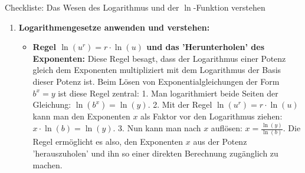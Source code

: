 \begin{loesungsumgebung}{Checkliste: Das Wesen des Logarithmus und der $\ln$-Funktion verstehen}
\begin{enumerate}[label=(\alph*)]
\begin{itemize}
        \item \textbf{Unterschiede im Graphenverlauf zwischen $g(x)=e^x$ und $f(x)=\ln(x)$:}
        \begin{itemize}
            \item \textbf{Monotonie:} Beide Funktionen sind streng monoton steigend in ihrem gesamten Definitionsbereich.
            \item \textbf{Krümmung:}
            $g(x)=e^x$: $g''(x)=e^x > 0$ für alle $x$. Der Graph ist immer linksgekrümmt (konvex).
            $f(x)=\ln(x)$: $f''(x)=-1/x^2 < 0$ für $x>0$. Der Graph ist immer rechtsgekrümmt (konkav).
            \item \textbf{Asymptoten:}
            $g(x)=e^x$: Hat eine horizontale Asymptote $y=0$ für $x \to -\infty$. Keine senkrechten Asymptoten.
            $f(x)=\ln(x)$: Hat eine senkrechte Asymptote $x=0$ (die y-Achse) für $x \to 0^+$, wobei $f(x) \to -\infty$. Keine horizontalen Asymptoten ($f(x) \to \infty$ für $x \to \infty$).
            \item \textbf{Achsenschnittpunkte:}
            $g(x)=e^x$: y-Achsenabschnitt $(0|1)$, keine Nullstellen.
            $f(x)=\ln(x)$: x-Achsenabschnitt (Nullstelle) $(1|0)$, keinen y-Achsenabschnitt.
            \item \textbf{Definitions-/Wertebereich:}
            $g(x)=e^x$: $D_g=\mathbb{R}$, $W_g=(0, \infty)$.
            $f(x)=\ln(x)$: $D_f=(0, \infty)$, $W_f=\mathbb{R}$. (Definitions- und Wertebereich sind vertauscht).
        \end{itemize}
        \textbf{Geometrische Beziehung:} Da $f(x)=\ln(x)$ die Umkehrfunktion von $g(x)=e^x$ ist, gehen ihre Graphen durch \textbf{Spiegelung an der Geraden $y=x$} (der Winkelhalbierenden des I. und III. Quadranten) auseinander hervor.
    \end{itemize}

    \item \textbf{Logarithmengesetze anwenden und verstehen:}
    \begin{itemize}
        \item \textbf{Regel $\ln(u^r) = r \cdot \ln(u)$ und das 'Herunterholen' des Exponenten:}
        Diese Regel besagt, dass der Logarithmus einer Potenz gleich dem Exponenten multipliziert mit dem Logarithmus der Basis dieser Potenz ist.
        Beim Lösen von Exponentialgleichungen der Form $b^x=y$ ist diese Regel zentral:
        1. Man logarithmiert beide Seiten der Gleichung: $\ln(b^x) = \ln(y)$.
        2. Mit der Regel $\ln(u^r) = r \cdot \ln(u)$ kann man den Exponenten $x$ als Faktor vor den Logarithmus ziehen: $x \cdot \ln(b) = \ln(y)$.
        3. Nun kann man nach $x$ auflösen: $x = \frac{\ln(y)}{\ln(b)}$.
        Die Regel ermöglicht es also, den Exponenten $x$ aus der Potenz 'herauszuholen' und ihn so einer direkten Berechnung zugänglich zu machen.


\end{itemize}
\end{enumerate}
\end{loesungsumgebung}
